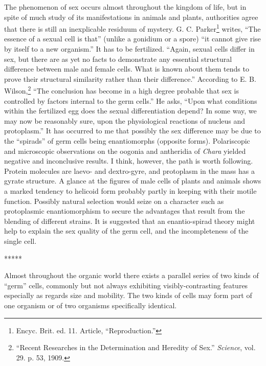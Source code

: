 \documentclass[a4paper, 12pt, oneside]{article}
\begin{document}
The phenomenon of sex occurs almost throughout the kingdom of life, but in spite of much study of its manifestations in animals and plants, authorities agree that there is still an inexplicable residuum of mystery. G. C. Parker\footnote{Encyc. Brit. ed. 11. Article, ``Reproduction.''} writes, ``The essence of a sexual cell is that'' (unlike a gonidium or a spore) ``it cannot give rise by itself to a new organism.'' It has to be fertilized. ``Again, sexual cells differ in sex, but there are as yet no facts to demonstrate any essential structural difference between male and female cells. What is known about them tends to prove their structural similarity rather than their difference.'' According to E. B. Wilson,\footnote{``Recent Researches in the Determination and Heredity of Sex.'' \emph{Science}, vol. 29. p. 53, 1909.} ``The conclusion has become in a high degree probable that sex is controlled by factors internal to the germ cells.'' He asks, ``Upon what conditions within the fertilized egg does the sexual differentiation depend? In some way, we may now be reasonably sure, upon the physiological reactions of nucleus and protoplasm.'' It has occurred to me that possibly the sex difference may be due to the ``spirads'' of germ cells being enantiomorphs (opposite forms). Polariscopic and microscopic observations on the oogonia and antheridia of \emph{Chara} yielded negative and inconclusive results. I think, however, the path is worth following. Protein molecules are laevo- and dextro-gyre, and protoplasm in the mass has a gyrate structure. A glance at the figures of male cells of plants and animals shows a marked tendency to helicoid form probably partly in keeping with their motile function. Possibly natural selection would seize on a character such as protoplasmic enantiomorphism to secure the advantages that result from the blending of different strains. It is suggested that an enantio-spirad theory might help to explain the sex quality of the germ cell, and the incompleteness of the single cell.

\centerline{*\hspace{15mm}*\hspace{15mm}*\hspace{15mm}*\hspace{15mm}*}
\bigskip

Almost throughout the organic world there exists a parallel series of two kinds of ``germ'' cells, commonly but not always exhibiting visibly-contrasting features especially as regards size and mobility. The two kinds of cells may form part of one organism or of two organisms specifically identical.
\end{document}
